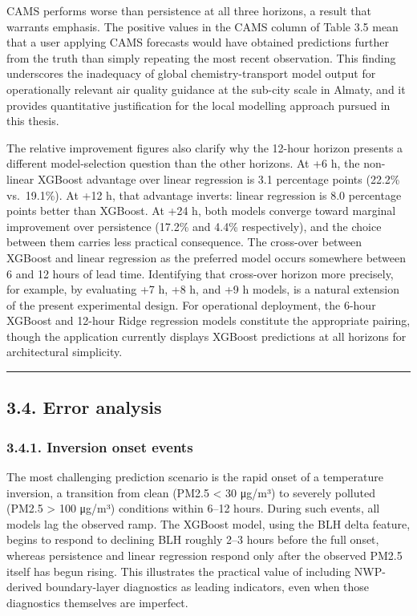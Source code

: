 CAMS performs worse than persistence at all three horizons, a result that warrants emphasis. The positive values in the CAMS column of Table 3.5 mean that a user applying CAMS forecasts would have obtained predictions further from the truth than simply repeating the most recent observation. This finding underscores the inadequacy of global chemistry-transport model output for operationally relevant air quality guidance at the sub-city scale in Almaty, and it provides quantitative justification for the local modelling approach pursued in this thesis.

The relative improvement figures also clarify why the 12-hour horizon presents a different model-selection question than the other horizons. At +6 h, the non-linear XGBoost advantage over linear regression is 3.1 percentage points (22.2\% vs.~19.1\%). At +12 h, that advantage inverts: linear regression is 8.0 percentage points better than XGBoost. At +24 h, both models converge toward marginal improvement over persistence (17.2\% and 4.4\% respectively), and the choice between them carries less practical consequence. The cross-over between XGBoost and linear regression as the preferred model occurs somewhere between 6 and 12 hours of lead time. Identifying that cross-over horizon more precisely, for example, by evaluating +7 h, +8 h, and +9 h models, is a natural extension of the present experimental design. For operational deployment, the 6-hour XGBoost and 12-hour Ridge regression models constitute the appropriate pairing, though the application currently displays XGBoost predictions at all horizons for architectural simplicity.

\begin{center}\rule{0.5\linewidth}{0.5pt}\end{center}

\subsection{3.4. Error analysis}\label{error-analysis}

\subsubsection{3.4.1. Inversion onset events}\label{inversion-onset-events}

The most challenging prediction scenario is the rapid onset of a temperature inversion, a transition from clean (PM2.5 \textless{} 30 μg/m³) to severely polluted (PM2.5 \textgreater{} 100 μg/m³) conditions within 6--12 hours. During such events, all models lag the observed ramp. The XGBoost model, using the BLH delta feature, begins to respond to declining BLH roughly 2--3 hours before the full onset, whereas persistence and linear regression respond only after the observed PM2.5 itself has begun rising. This illustrates the practical value of including NWP-derived boundary-layer diagnostics as leading indicators, even when those diagnostics themselves are imperfect.

